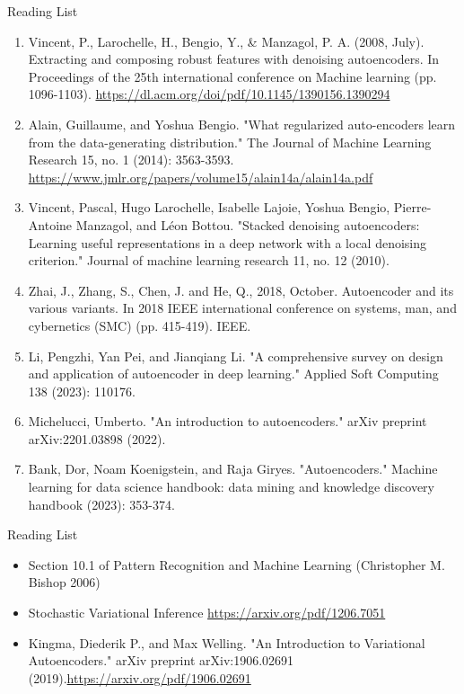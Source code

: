 \documentclass[aspectratio=169,xcolor=dvipsnames,svgnames,x11names,fleqn]{beamer}
\begin{document}
\begin{frame}{Reading List}

\scriptsize

\begin{enumerate}
\item Vincent, P., Larochelle, H., Bengio, Y., \& Manzagol, P. A. (2008, July). Extracting and composing robust features with denoising autoencoders. In Proceedings of the 25th international conference on Machine learning (pp. 1096-1103). \url{https://dl.acm.org/doi/pdf/10.1145/1390156.1390294}
\item Alain, Guillaume, and Yoshua Bengio. "What regularized auto-encoders learn from the data-generating distribution." The Journal of Machine Learning Research 15, no. 1 (2014): 3563-3593. \url{https://www.jmlr.org/papers/volume15/alain14a/alain14a.pdf}
\item Vincent, Pascal, Hugo Larochelle, Isabelle Lajoie, Yoshua Bengio, Pierre-Antoine Manzagol, and Léon Bottou. "Stacked denoising autoencoders: Learning useful representations in a deep network with a local denoising criterion." Journal of machine learning research 11, no. 12 (2010).
\item Zhai, J., Zhang, S., Chen, J. and He, Q., 2018, October. Autoencoder and its various variants. In 2018 IEEE international conference on systems, man, and cybernetics (SMC) (pp. 415-419). IEEE.
\item Li, Pengzhi, Yan Pei, and Jianqiang Li. "A comprehensive survey on design and application of autoencoder in deep learning." Applied Soft Computing 138 (2023): 110176.
\item Michelucci, Umberto. "An introduction to autoencoders." arXiv preprint arXiv:2201.03898 (2022).
\item Bank, Dor, Noam Koenigstein, and Raja Giryes. "Autoencoders." Machine learning for data science handbook: data mining and knowledge discovery handbook (2023): 353-374.
\end{enumerate}

\end{frame}


\begin{frame}{Reading List}

\begin{itemize}

\item Section 10.1 of Pattern Recognition and Machine Learning (Christopher M. Bishop 2006)
\item Stochastic Variational Inference \url{https://arxiv.org/pdf/1206.7051}

\item Kingma, Diederik P., and Max Welling. "An Introduction to Variational Autoencoders." arXiv preprint arXiv:1906.02691 (2019).\url{https://arxiv.org/pdf/1906.02691}

\end{itemize}



\end{frame}
\end{document}
